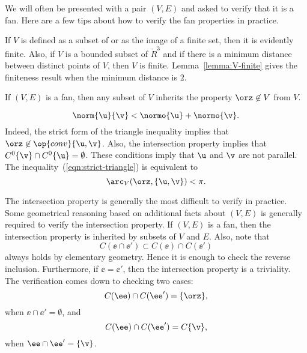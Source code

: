 \begin{remark}\label{remark:fan-verify}  
We will often be presented with a pair $(V,E)$ and asked to verify
that it is a fan.  Here are a few tips about how to verify the fan
properties in practice.
\begin{description} 
\item {} If $V$ is defined as a subset of or as the image of a
finite set, then it is evidently finite.  Also, if $V$ is a bounded
subset of $\ring{R}^3$ and if there is a minimum distance between
distinct points of $V$, then $V$ is finite.
Lemma~\ref{lemma:V-finite} gives the finiteness result when the
minimum distance is $2$.\vspace{6pt}
\item {} If $(V,E)$ is a fan, then any subset of $V$
inherits the property $\orz\not\in V$ from $V$.  \vspace{6pt}
\item {} 
\begin{equation}\label{eqn:strict-triangle}
\norm{\u}{\v} < \normo{\u} + \normo{\v}.
\end{equation}
Indeed, the strict form of the triangle inequality implies that
$\orz\not\in \op{conv}\{\u,\v\}$.  Also, the intersection property
implies that $C^0\{\v\} \cap C^0\{\u\} = \emptyset$.  These conditions
imply that $\u$ and $\v$ are not parallel.  The inequality~(\ref{eqn:strict-triangle})
is equivalent to
\begin{displaymath}
\arc_V(\orz,\{\u,\v\}) < \pi.
\end{displaymath}
\item {} The intersection property is generally the
most difficult to verify in practice.  Some geometrical reasoning
based on additional facts about $(V,E)$ is generally required to
verify the intersection property.  If $(V,E)$ is a fan, then the
intersection property is inherited by subsets of $V$ and $E$.  Also,
note that
\begin{displaymath}
C(\ee\cap \ee') \subset C(\ee) \cap C(\ee')
\end{displaymath}
always holds by elementary geometry.  Hence it is enough to check the
reverse inclusion.  Furthermore, if $\ee = \ee'$, then the
intersection property is a triviality.  The verification comes down to
checking two cases:
\begin{displaymath}
C(\ee) \cap C(\ee') = \{\orz\},
\end{displaymath}
when $\ee\cap \ee' = \emptyset$, and
\begin{displaymath}
C(\ee)\cap C(\ee') = C\{\v\},
\end{displaymath}
when $\ee\cap \ee' = \{\v\}$.
\end{description}
\end{remark}

